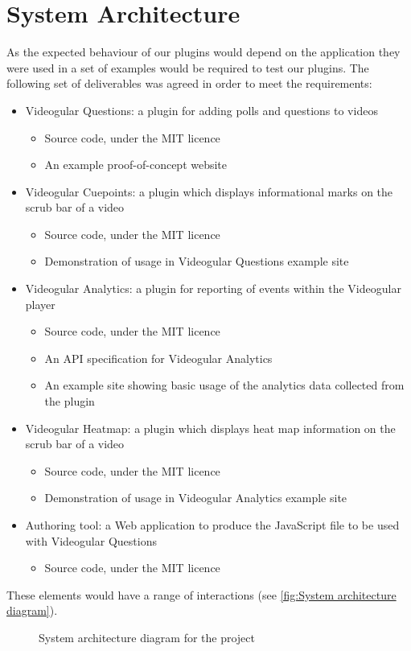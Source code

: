 \section{System Architecture}
As the expected behaviour of our plugins would depend on the application they were used in a set of examples would be required to test our plugins. The following set of deliverables was agreed in order to meet the requirements:
\begin{itemize}
\item Videogular Questions: a plugin for adding polls and questions to videos
\begin{itemize}
\item Source code, under the MIT licence
\item An example proof-of-concept website
\end{itemize}
\item Videogular Cuepoints: a plugin which displays informational marks on the scrub bar of a video
\begin{itemize}
\item Source code, under the MIT licence
\item Demonstration of usage in Videogular Questions example site
\end{itemize}
\item Videogular Analytics: a plugin for reporting of events within the Videogular player
\begin{itemize}
\item Source code, under the MIT licence
\item An API specification for Videogular Analytics
\item An example site showing basic usage of the analytics data collected from the plugin
\end{itemize}
\item Videogular Heatmap: a plugin which displays heat map information on the scrub bar of a video
\begin{itemize}
\item Source code, under the MIT licence
\item Demonstration of usage in Videogular Analytics example site
\end{itemize}
\item Authoring tool: a Web application to produce the JavaScript file to be used with Videogular Questions
\begin{itemize}
\item Source code, under the MIT licence
\end{itemize}
\end{itemize}

These elements would have a range of interactions (see \autoref{fig:System architecture diagram}).

\begin{figure}[h!]
\centering

\caption{System architecture diagram for the project \label{fig:System architecture diagram}}
\end{figure}

